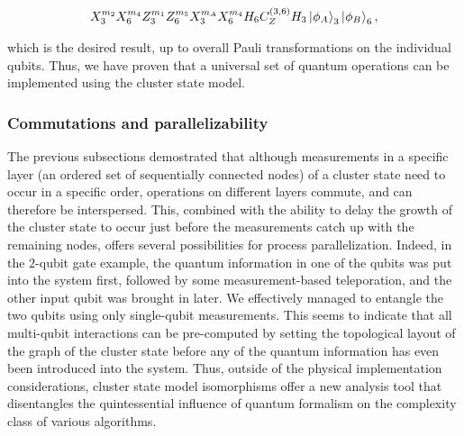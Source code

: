 \documentclass[twocolumn]{Styles/IEEEtran11}
\begin{document}
\begin{gather*}
  X_3^{m_2}X_6^{m_4}Z_3^{m_1}Z_6^{m_5}X_3^{m_A}X_6^{m_4}H_6C_Z^{(3,6)}H_3\left|\mspace{0.5mu} \phi_A \mspace{0.5mu}\right\rangle_3\left|\mspace{0.5mu} \phi_B \mspace{0.5mu}\right\rangle_6,
\end{gather*}

\noindent which is the desired result, up to overall Pauli transformations on the individual qubits. Thus, we have proven that a universal set of quantum operations can be implemented using the cluster state model.

\subsubsection{Commutations and parallelizability}

The previous subsections demostrated that although measurements in a specific layer (an ordered set of sequentially connected nodes) of a cluster state need to occur in a specific order, operations on different layers commute, and can therefore be interspersed. This, combined with the ability to delay the growth of the cluster state to occur just before the measurements catch up with the remaining nodes, offers several possibilities for process parallelization. Indeed, in the $2$-qubit gate example, the quantum information in one of the qubits was put into the system first, followed by some measurement-based teleporation, and the other input qubit was brought in later. We effectively managed to entangle the two qubits using only single-qubit measurements. This seems to indicate that all multi-qubit interactions can be pre-computed by setting the topological layout of the graph of the cluster state before any of the quantum information has even been introduced into the system. Thus, outside of the physical implementation considerations, cluster state model isomorphisms offer a new analysis tool that disentangles the quintessential influence of quantum formalism on the complexity class of various algorithms.


\end{document}
